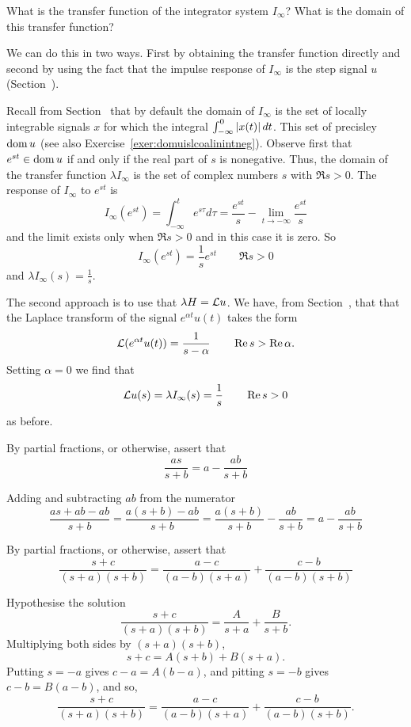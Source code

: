 \begin{excersizelist}
\item What is the transfer function of the integrator system $I_\infty$?  What is the domain of this transfer function? 
\begin{solution}
We can do this in two ways.  First by obtaining the transfer function directly and second by using the fact that the impulse response of $I_\infty$ is the step signal $u$ (Section~).

Recall from Section~ that by default the domain of $I_\infty$ is the set of locally integrable signals $x$ for which the integral $\int_{-\infty}^0 \left\vert x(t) \right\vert dt$.  This set of precisley $\operatorname{dom} u$ (see also Exercise~\ref{exer:domuislcoalinintneg}).  Observe first that $e^{st} \in \operatorname{dom} u$ if and only if the real part of $s$ is nonegative.  Thus, the domain of the transfer function $\lambda I_{\infty}$ is the set of complex numbers $s$ with $\Re s > 0$.  The response of $I_\infty$ to $e^{st}$ is
\[
I_\infty(e^{st}) = \int_{-\infty}^t e^{s\tau} d\tau = \frac{e^{st}}{s} - \lim_{t\to -\infty}\frac{e^{st}}{s}
\]
and the limit exists only when $\Re{s} > 0$ and in this case it is zero.  So
\[
I_\infty(e^{st}) = \frac{1}{s} e^{st} \qquad \Re{s} > 0
\]
and $\lambda I_\infty(s) = \tfrac{1}{s}$.

The second approach is to use that $\lambda H = \mathcal L u$.  We have, from Section~, that that the Laplace transform of the signal $e^{\alpha t} u(t)$ takes the form
\[
\mathcal L(e^{ \alpha t}u(t)) = \frac{1}{s-\alpha} \qquad \operatorname{Re} s > \operatorname{Re} \alpha.
\]
Setting $\alpha = 0$ we find that
\[
\mathcal L u(s) = \lambda I_\infty(s) = \frac{1}{s} \qquad \operatorname{Re} s > 0
\]
as before.
\end{solution}


\item \label{exer:partialfracfirstorder} By partial fractions, or otherwise, assert that
\[
\frac{as}{s+b} = a - \frac{ab}{s+b}
\]
\begin{solution}
Adding and subtracting $ab$ from the numerator
\[
\frac{as+ab-ab}{s+b} = \frac{a(s+b)-ab}{s+b} = \frac{a(s+b)}{s+b} - \frac{ab}{s+b} = a - \frac{ab}{s+b}
\]
\end{solution}

\item \label{exer:partialfracsecondorder} By partial fractions, or otherwise, assert that
\[
\frac{s + c}{(s+a)(s+b)} = \frac{a-c}{(a-b)(s+a)} + \frac{c-b}{(a-b)(s+b)}
\]
\begin{solution}
Hypothesise the solution
\[
\frac{s + c}{(s+a)(s+b)} = \frac{A}{s+a} + \frac{B}{s+b}.
\]
Multiplying both sides by $(s+a)(s+b)$,
\[
s+c = A(s+b) + B(s+a).
\]
Putting $s = -a$ gives $c-a = A(b-a)$, and pitting $s=-b$ gives $c-b = B(a-b)$, and so,
\[
\frac{s+c}{(s+a)(s+b)} = \frac{a-c}{(a-b)(s+a)} + \frac{c-b}{(a-b)(s+b)}.
\]
\end{solution}


\end{excersizelist}
